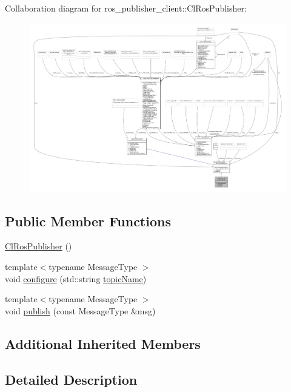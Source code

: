 Collaboration diagram for ros\+\_\+publisher\+\_\+client\+:\+:Cl\+Ros\+Publisher\+:
\nopagebreak
\begin{figure}[H]
\begin{center}
\leavevmode
\includegraphics[width=350pt]{classros__publisher__client_1_1ClRosPublisher__coll__graph}
\end{center}
\end{figure}
\subsection*{Public Member Functions}
\begin{DoxyCompactItemize}
\item 
\hyperlink{classros__publisher__client_1_1ClRosPublisher_a9a5c4a6c97a6fcab30827521891f222f}{Cl\+Ros\+Publisher} ()
\item 
{\footnotesize template$<$typename Message\+Type $>$ }\\void \hyperlink{classros__publisher__client_1_1ClRosPublisher_aae4ef0ad45fd4f4e24659b9386af80a3}{configure} (std\+::string \hyperlink{classsmacc_1_1client__bases_1_1SmaccPublisherClient_a8b8d98aef9b3b3a441005d2cb17b4fcc}{topic\+Name})
\item 
{\footnotesize template$<$typename Message\+Type $>$ }\\void \hyperlink{classros__publisher__client_1_1ClRosPublisher_a9e62a3581a730cd2e287e560d04d151b}{publish} (const Message\+Type \&msg)
\end{DoxyCompactItemize}
\subsection*{Additional Inherited Members}


\subsection{Detailed Description}


